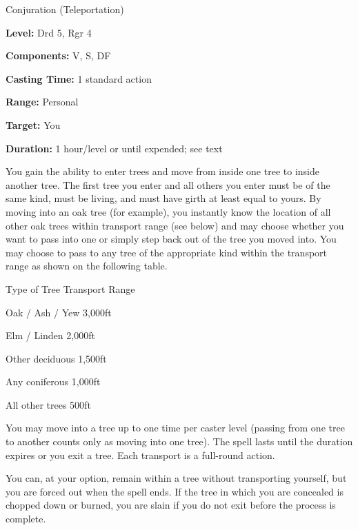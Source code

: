 
Conjuration (Teleportation)

\textbf{Level:} Drd 5, Rgr 4

\textbf{Components:} V, S, DF

\textbf{Casting Time:} 1 standard action

\textbf{Range:} Personal

\textbf{Target:} You

\textbf{Duration:} 1 hour/level or until expended; see text

You gain the ability to enter trees and move from inside one tree to inside another 
tree. The first tree you enter and all others you enter must be of the same kind, 
must be living, and must have girth at least equal to yours. By moving into an 
oak tree (for example), you instantly know the location of all other oak trees 
within transport range (see below) and may choose whether you want to pass into 
one or simply step back out of the tree you moved into. You may choose to pass 
to any tree of the appropriate kind within the transport range as shown on the 
following table.

\begin{description*}
\item[Type of Tree] Transport Range
\item[Oak / Ash / Yew] 3,000ft
\item[Elm / Linden] 2,000ft
\item[Other deciduous] 1,500ft
\item[Any coniferous] 1,000ft
\item[All other trees] 500ft
\end{description*}

You may move into a tree up to one time per caster level (passing from one tree 
to another counts only as moving into one tree). The spell lasts until the duration 
expires or you exit a tree. Each transport is a full-round action.

You can, at your option, remain within a tree without transporting yourself, but 
you are forced out when the spell ends. If the tree in which you are concealed 
is chopped down or burned, you are slain if you do not exit before the process 
is complete.

